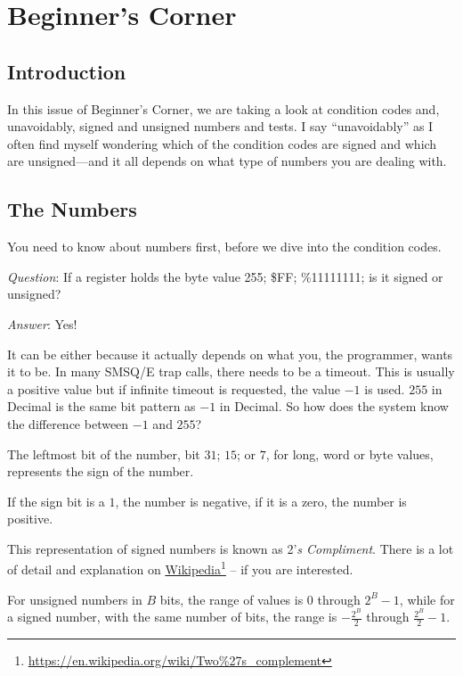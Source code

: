 
\chapter{Beginner's Corner}\label{chpater: beginners corner}

\section{Introduction}

In this issue of Beginner's Corner, we are taking a look at condition
codes and, unavoidably, signed and unsigned numbers and tests. I say
``unavoidably'' as I often find myself wondering which of the condition
codes are signed and which are unsigned---and it all depends on
what type of numbers you are dealing with.

\section{The Numbers}

You need to know about numbers first, before we dive into the condition
codes. 

\emph{Question}: If a register holds the byte value 255;  \$FF;  \%11111111;
is it signed or unsigned?

\emph{Answer}: Yes!

It can be either because it actually depends on what you, the programmer,
wants it to be. In many SMSQ/E trap calls, there needs to be a timeout.
This is usually a positive value but if infinite timeout is requested,
the value $-1$ is used. $255$ in Decimal is the same bit pattern
as $-1$ in Decimal. So how does the system know the difference between
$-1$ and $255$?

The leftmost bit of the number, bit $31$; $15$; or $7$, for long,
word or byte values, represents the sign of the number. 

If the sign bit is a $1$, the number is negative, if it is a zero,
the number is positive. 

This representation of signed numbers is known as 2'\emph{s Compliment}.
There is a lot of detail and explanation on \href{https://en.wikipedia.org/wiki/Two\%27s_complement}{Wikipedia}\footnote{\url{https://en.wikipedia.org/wiki/Two\%27s\_complement}}
-- if you are interested. 

For unsigned numbers in $B$ bits, the range of values is $0$ through
$2^{B}-1$, while for a signed number, with the same number of bits,
the range is $-\frac{2^{B}}{2}$ through $\frac{2^{B}}{2}-1$.

